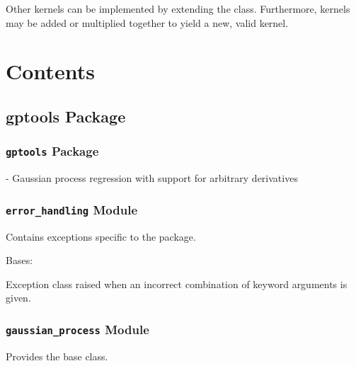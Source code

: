 \documentclass[letterpaper,10pt,english]{sphinxmanual}
\begin{document}
Other kernels can be implemented by extending the {\hyperref[gptools.kernel:gptools.kernel.core.Kernel]{}} class. Furthermore, kernels may be added or multiplied together to yield a new, valid kernel.


\chapter{Contents}
\label{index:contents}

\section{gptools Package}
\label{gptools:gptools-package}\label{gptools::doc}

\subsection{\texttt{gptools} Package}
\label{gptools:id1}\label{gptools:module-gptools.__init__}
 - Gaussian process regression with support for arbitrary derivatives


\subsection{\texttt{error\_handling} Module}
\label{gptools:error-handling-module}\label{gptools:module-gptools.error_handling}
Contains exceptions specific to the  package.

\begin{fulllineitems}
\label{gptools:gptools.error_handling.GPArgumentError}
Bases: 

Exception class raised when an incorrect combination of keyword arguments is given.

\end{fulllineitems}



\subsection{\texttt{gaussian\_process} Module}
\label{gptools:module-gptools.gaussian_process}\label{gptools:gaussian-process-module}
Provides the base {\hyperref[gptools:gptools.gaussian_process.GaussianProcess]{}} class.
\end{document}
